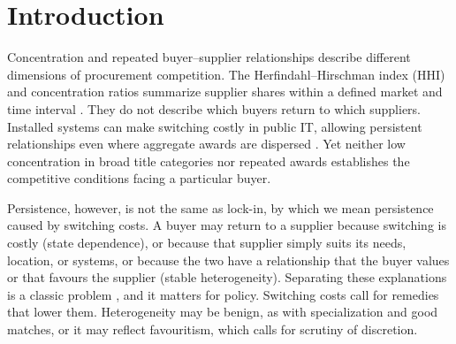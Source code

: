 \documentclass[pdflatex,sn-apa]{sn-jnl}
\begin{document}
\section{Introduction}\label{sec:intro}

Concentration and repeated buyer--supplier relationships describe different dimensions of procurement competition. The Herfindahl--Hirschman index (HHI) and concentration ratios summarize supplier shares within a defined market and time interval \citep{hirschman1964,rhoades1993,HMG1992,MergerGuidelines2023}. They do not describe which buyers return to which suppliers. Installed systems can make switching costly in public IT, allowing persistent relationships even where aggregate awards are dispersed \citep{Klemperer1987,FarrellShapiro1988,Shapiro1995,BorensteinMackieMasonNetz2000,FarrellKlemperer2007,Greenstein1993}. Yet neither low concentration in broad title categories nor repeated awards establishes the competitive conditions facing a particular buyer.

Persistence, however, is not the same as lock-in, by which we mean persistence caused by switching costs. A buyer may return to a supplier because switching is costly (state dependence), or because that supplier simply suits its needs, location, or systems, or because the two have a relationship that the buyer values or that favours the supplier (stable heterogeneity). Separating these explanations is a classic problem \citep{HeckmanBorjas1980,Heckman1981,Keane1997,Dube2010}, and it matters for policy. Switching costs call for remedies that lower them. Heterogeneity may be benign, as with specialization and good matches, or it may reflect favouritism, which calls for scrutiny of discretion.
\end{document}
